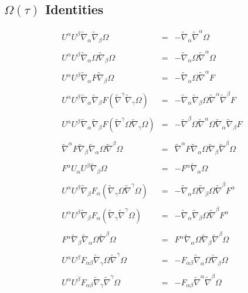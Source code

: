 \documentclass[10pt,letterpaper]{article}
\numberwithin{equation}{section}
\begin{document}
\subsection{$\Omega(\tau)$ Identities}
\begin{eqnarray}
U^\alpha U^\beta \tilde\nabla_\alpha\tilde\nabla_\beta\Omega&=&-\tilde\nabla_\alpha\tilde\nabla^\alpha \Omega  
\\ \nonumber\\
U^\alpha U^\beta \tilde\nabla_\alpha\Omega\tilde\nabla_\beta\Omega &=& - \tilde\nabla_\alpha\Omega \tilde\nabla^\alpha \Omega
\\ \nonumber\\
U^\alpha U^\beta \tilde\nabla_\alpha F \tilde\nabla_\beta \Omega &=& - \tilde\nabla_\alpha \Omega \tilde\nabla^\alpha F
\\ \nonumber\\
U^\alpha U^\beta \tilde\nabla_\alpha \tilde\nabla_\beta F (\tilde\nabla^\gamma\tilde\nabla_\gamma\Omega) &=&
-\tilde\nabla_\alpha\tilde\nabla_\beta \Omega \tilde\nabla^\alpha\tilde\nabla^\beta F
\\ \nonumber\\
U^\alpha U^\beta \tilde\nabla_\alpha \tilde\nabla_\beta F (\tilde\nabla^\gamma\Omega\tilde\nabla_\gamma \Omega) &=&
-\tilde\nabla^\beta\Omega\tilde\nabla^\alpha\Omega \tilde\nabla_\alpha\tilde\nabla_\beta F
\\ \nonumber\\
\tilde\nabla^\alpha F \tilde\nabla_\beta\tilde\nabla_\alpha\Omega\tilde\nabla^\beta\Omega &=& \tilde\nabla^\alpha F \tilde\nabla_\alpha\Omega \tilde\nabla_\beta\tilde\nabla^\beta\Omega
\\ \nonumber\\
F^\alpha  U_\alpha U^\beta \tilde\nabla_\beta\Omega &=& -F^\alpha \tilde\nabla_\alpha \Omega
\\ \nonumber\\
U^\alpha U^\beta \tilde\nabla_\beta F_\alpha (\tilde\nabla_\gamma \Omega \tilde\nabla^\gamma \Omega) &=&
-\tilde\nabla_\alpha\Omega \tilde\nabla_\beta\Omega \tilde\nabla^\beta F^\alpha
\\ \nonumber\\
U^\alpha U^\beta \tilde\nabla_\beta F_\alpha (\tilde\nabla_\gamma \tilde\nabla^\gamma \Omega)&=&
-\tilde\nabla_\alpha\tilde\nabla_\beta \Omega\tilde\nabla^\beta F^\alpha
\\ \nonumber\\
F^\alpha \tilde\nabla_\beta\tilde\nabla_\alpha\Omega\tilde\nabla^\beta\Omega &=& F^\alpha \tilde\nabla_\alpha\Omega \tilde\nabla_\beta\tilde\nabla^\beta\Omega
\\ \nonumber\\
U^\alpha U^\beta F_{\alpha\beta}\tilde\nabla_\gamma\Omega\tilde\nabla^\gamma\Omega &=&
-F_{\alpha\beta}\tilde\nabla_\alpha\Omega\tilde\nabla_\beta\Omega
\\ \nonumber\\
U^\alpha U^\beta F_{\alpha\beta} \tilde\nabla_\gamma\tilde\nabla^\gamma\Omega &=&-F_{\alpha\beta}\tilde\nabla^\alpha\tilde\nabla^\beta \Omega
\end{eqnarray}
%
%
\end{document}
